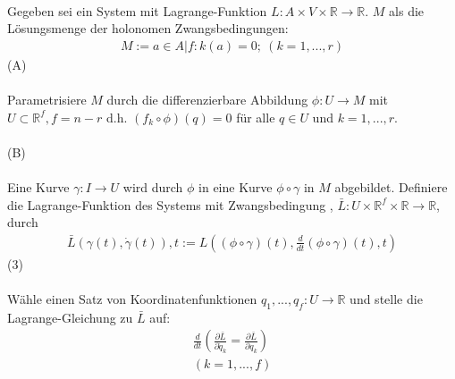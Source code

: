 \documentclass[10pt,a4paper]{article}
\begin{document}
\\
Gegeben sei ein System mit Lagrange-Funktion $L: A \times V \times \mathbb{R} \longrightarrow \mathbb{R}$.
$M$ als die Lösungsmenge der holonomen Zwangsbedingungen:
\begin{align}
M := {a \in A \vert f:k(a)=0; \ (k=1,...,r)}
\end{align}
(A)\\
\\
Parametrisiere $M$ durch die differenzierbare Abbildung $ \phi : U \longrightarrow M $ mit $ U\subset \mathbb{R}^f, f=n-r $ d.h. $(f_k\circ \phi)(q)=0 $ für alle $ q \in U$ und $k=1,...,r$.\\
\\
(B)\\
\\
Eine Kurve $ \gamma : I \longrightarrow U $ wird durch $  \phi $ in eine Kurve $ \phi \circ \gamma $ in $M$ abgebildet. Definiere die Lagrange-Funktion des Systems mit Zwangsbedingung , $ \bar{L} : U \times  \mathbb{R}^f \times \mathbb{R} \longrightarrow \mathbb{R}$, durch
\begin{align}
\bar{L}(\gamma(t), \dot{\gamma}(t)),t := L((\phi \circ \gamma)(t), \frac{d}{dt}( \phi \circ \gamma)(t),t)
\end{align}
(3)\\
\\
Wähle einen Satz von Koordinatenfunktionen $q_1,...,q_f : U \longrightarrow \mathbb{R}$ und stelle die Lagrange-Gleichung zu $\bar{L} $ auf:
\begin{align}
\frac{d}{dt}(\frac{\partial \bar{L}}{\partial \dot{q}_k}=\frac{\partial \bar{L}}{\partial q_k}) \\
(k=1,...,f)
\end{align}
\end{document}
